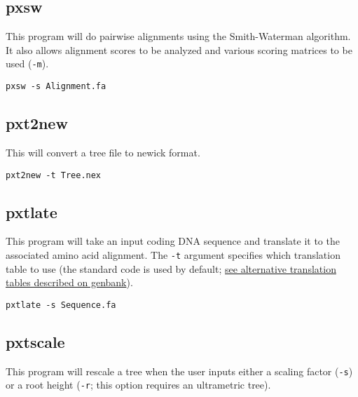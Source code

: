 \documentclass[12pt,letterpaper]{memoir}
\begin{document}
\subsection{pxsw}

This program will do pairwise alignments using the Smith-Waterman algorithm. It also allows alignment scores to be analyzed and various scoring matrices to be used (\texttt{-m}).

\begin{flushleft}
\begin{verbatim}
pxsw -s Alignment.fa
\end{verbatim}
\end{flushleft}

\subsection{pxt2new}

This will convert a tree file to newick format.

\begin{flushleft}
\begin{verbatim}
pxt2new -t Tree.nex
\end{verbatim}
\end{flushleft}

\subsection{pxtlate}

This program will take an input coding DNA sequence and translate it to the associated amino acid alignment. The \texttt{-t} argument specifies which translation table to use (the standard code is used by default; \href{https://www.ncbi.nlm.nih.gov/Taxonomy/Utils/wprintgc.cgi}{see alternative translation tables described on genbank}).


\begin{flushleft}
\begin{verbatim}
pxtlate -s Sequence.fa
\end{verbatim}
\end{flushleft}

\subsection{pxtscale}

This program will rescale a tree when the user inputs either a scaling factor (\texttt{-s}) or a root height (\texttt{-r}; this option requires an ultrametric tree).
\end{document}
